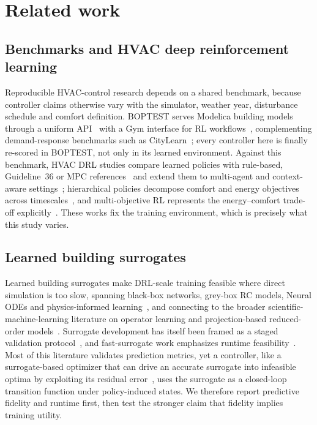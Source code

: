 \documentclass[energies,article,submit,moreauthors]{Definitions/mdpi}
\begin{document}
\section{Related work}\label{sec:related}

\subsection{Benchmarks and HVAC deep reinforcement learning}
Reproducible HVAC-control research depends on a shared benchmark, because controller claims
otherwise vary with the simulator, weather year, disturbance schedule and comfort definition.
BOPTEST serves Modelica building models through a uniform
API~\cite{Blum2021BOPTEST,Wetter2014Modelica} with a Gym interface for RL
workflows~\cite{Arroyo2021GymBOPTEST}, complementing demand-response benchmarks such as
CityLearn~\cite{VazquezCanteli2019CityLearn,VazquezCanteli2019Review}; every controller here is
finally re-scored in BOPTEST, not only in its learned environment. Against this benchmark, HVAC DRL
studies compare learned policies with rule-based, Guideline~36 or MPC
references~\cite{Savino2025ASHRAE,Wang2025SafeDRL,Nguyen2024Modelling,Sun2024DirectTSup} and extend
them to multi-agent and context-aware
settings~\cite{Deng2025MultiAgent,Alotaibi2025ContextAware}; hierarchical policies decompose
comfort and energy objectives across timescales~\cite{Liao2025HDRL,Bacon2017Options,Nachum2018HIRO},
and multi-objective RL represents the energy--comfort trade-off
explicitly~\cite{Yang2019MORL,Roijers2013MOSurvey,Hayes2022MOSurvey,Byeon2025MaxMinMORL}. These
works fix the training environment, which is precisely what this study varies.

\subsection{Learned building surrogates}
Learned building surrogates make DRL-scale training feasible where direct simulation is too slow,
spanning black-box networks, grey-box RC models, Neural ODEs and physics-informed
learning~\cite{Bacher2011RCIdentification,Berthou2014RC,Bunning2020RC,Picard2017WhiteBox,Raissi2019PINN,Chen2018NeuralODE,Karpatne2017TheoryGuided,Willard2022PIML,Hedayat2025PINN},
and connecting to the broader scientific-machine-learning literature on operator learning and
projection-based reduced-order models~\cite{Lu2021DeepONet,Li2021FNO,Benner2015ROM}. Surrogate
development has itself been framed as a staged validation protocol~\cite{HouEvins2024}, and
fast-surrogate work emphasizes runtime feasibility~\cite{Mshragi2026FastML}. Most of this literature
validates prediction metrics, yet a controller, like a surrogate-based optimizer that can drive an
accurate surrogate into infeasible optima by exploiting its residual error~\cite{Jones1998EGO}, uses
the surrogate as a closed-loop transition function under policy-induced states. We therefore report
predictive fidelity and runtime first, then test the stronger claim that fidelity implies training
utility.
\end{document}
